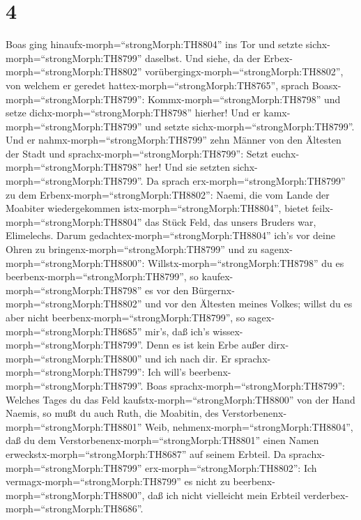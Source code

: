 \hypertarget{section-3}{%
\section{4}\label{section-3}}

 Boas ging hinaufx-morph=``strongMorph:TH8804'' ins Tor und
setzte sichx-morph=``strongMorph:TH8799'' daselbst. Und siehe, da der
Erbex-morph=``strongMorph:TH8802''
vorübergingx-morph=``strongMorph:TH8802'', von welchem er geredet
hattex-morph=``strongMorph:TH8765'', sprach
Boasx-morph=``strongMorph:TH8799'': Kommx-morph=``strongMorph:TH8798''
und setze dichx-morph=``strongMorph:TH8798'' hierher! Und er
kamx-morph=``strongMorph:TH8799'' und setzte
sichx-morph=``strongMorph:TH8799''.  Und er
nahmx-morph=``strongMorph:TH8799'' zehn Männer von den Ältesten der
Stadt und sprachx-morph=``strongMorph:TH8799'': Setzt
euchx-morph=``strongMorph:TH8798'' her! Und sie setzten
sichx-morph=``strongMorph:TH8799''.  Da sprach
erx-morph=``strongMorph:TH8799'' zu dem
Erbenx-morph=``strongMorph:TH8802'': Naemi, die vom Lande der Moabiter
wiedergekommen istx-morph=``strongMorph:TH8804'', bietet
feilx-morph=``strongMorph:TH8804'' das Stück Feld, das unsers Bruders
war, Elimelechs.  Darum
gedachtex-morph=``strongMorph:TH8804'' ich's vor deine Ohren zu
bringenx-morph=``strongMorph:TH8799'' und zu
sagenx-morph=``strongMorph:TH8800'':
Willstx-morph=``strongMorph:TH8798'' du es
beerbenx-morph=``strongMorph:TH8799'', so
kaufex-morph=``strongMorph:TH8798'' es vor den
Bürgernx-morph=``strongMorph:TH8802'' und vor den Ältesten meines
Volkes; willst du es aber nicht beerbenx-morph=``strongMorph:TH8799'',
so sagex-morph=``strongMorph:TH8685'' mir's, daß ich's
wissex-morph=``strongMorph:TH8799''. Denn es ist kein Erbe außer
dirx-morph=``strongMorph:TH8800'' und ich nach dir. Er
sprachx-morph=``strongMorph:TH8799'': Ich will's
beerbenx-morph=``strongMorph:TH8799''.  Boas
sprachx-morph=``strongMorph:TH8799'': Welches Tages du das Feld
kaufstx-morph=``strongMorph:TH8800'' von der Hand Naemis, so mußt du
auch Ruth, die Moabitin, des Verstorbenenx-morph=``strongMorph:TH8801''
Weib, nehmenx-morph=``strongMorph:TH8804'', daß du dem
Verstorbenenx-morph=``strongMorph:TH8801'' einen Namen
erweckstx-morph=``strongMorph:TH8687'' auf seinem Erbteil. 
Da sprachx-morph=``strongMorph:TH8799''
erx-morph=``strongMorph:TH8802'': Ich
vermagx-morph=``strongMorph:TH8799'' es nicht zu
beerbenx-morph=``strongMorph:TH8800'', daß ich nicht vielleicht mein
Erbteil verderbex-morph=``strongMorph:TH8686''.
